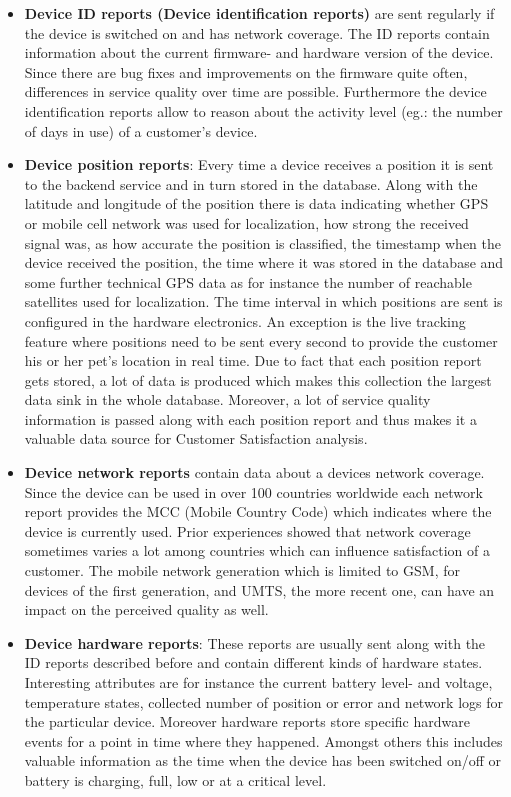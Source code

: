 \begin{itemize}
	\item \textbf{Device ID reports (Device identification reports)} are sent regularly if the device is switched on and has network coverage. The ID reports contain information about the current firmware- and hardware version of the device. Since there are bug fixes and improvements on the firmware quite often, differences in service quality over time are possible. Furthermore the device identification reports allow to reason about the activity level (eg.: the number of days in use) of a customer's device.
	\item \textbf{Device position reports}: Every time a device receives a position it is sent to the backend service and in turn stored in the database. Along with the latitude and longitude of the position there is data indicating whether GPS or mobile cell network was used for localization, how strong the received signal was, as how accurate the position is classified, the timestamp when the device received the position, the time where it was stored in the database and some further technical GPS data as for instance the number of reachable satellites used for localization. The time interval in which positions are sent is configured in the hardware electronics. An exception is the live tracking feature where positions need to be sent every second to provide the customer his or her pet's location in real time. Due to fact that each position report gets stored, a lot of data is produced which makes this collection the largest data sink in the whole database. Moreover, a lot of service quality information is passed along with each position report and thus makes it a valuable data source for Customer Satisfaction analysis. 
	\item \textbf{Device network reports} contain data about a devices network coverage. Since the device can be used in over 100 countries worldwide each network report provides the MCC (Mobile Country Code) which indicates where the device is currently used. Prior experiences showed that network coverage sometimes varies a lot among countries which can influence satisfaction of a customer. The mobile network generation which is limited to GSM, for devices of the first generation, and UMTS, the more recent one, can have an impact on the perceived quality as well.
	\item \textbf{Device hardware reports}: These reports are usually sent along with the ID reports described before and contain different kinds of hardware states. Interesting attributes are for instance the current battery level- and voltage, temperature states, collected number of position or error and network logs for the particular device. Moreover hardware reports store specific hardware events for a point in time where they happened. Amongst others this includes valuable information as the time when the device has been switched on/off or battery is charging, full, low or at a critical level. 

\end{itemize}
